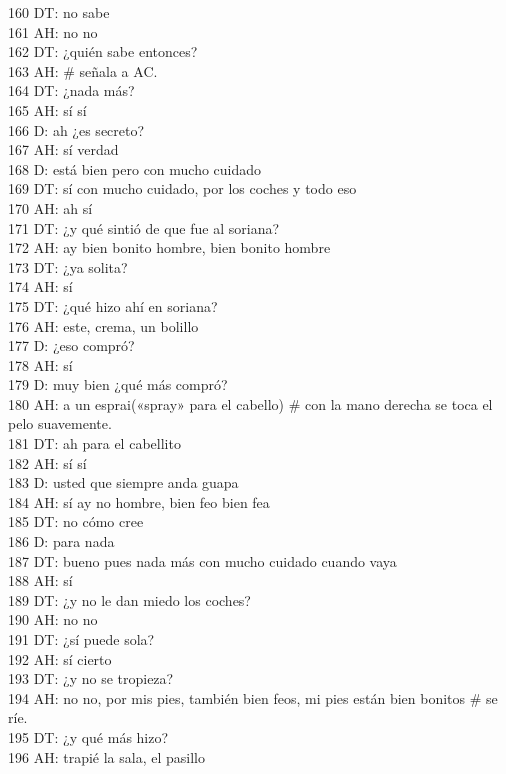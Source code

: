 160 DT: no sabe\\
161 AH: no no\\
162 DT: ¿quién sabe entonces?\\
163 AH: \# señala a AC.\\
164 DT: ¿nada más?\\
165 AH: sí sí\\
166 D: ah ¿es secreto?\\
167 AH: sí verdad\\
168 D: está bien pero con mucho cuidado\\
169 DT: sí con mucho cuidado, por los coches y todo eso\\
170 AH: ah sí\\
171 DT: ¿y qué sintió de que fue al soriana?\\
172 AH: ay bien bonito hombre, bien bonito hombre\\
173 DT: ¿ya solita?\\
174 AH: sí\\
175 DT: ¿qué hizo ahí en soriana?\\
176 AH: este, crema, un bolillo\\
177 D: ¿eso compró?\\
178 AH: sí\\
179 D: muy bien ¿qué más compró?\\
180 AH: a un esprai(«spray» para el cabello) \# con la mano derecha se toca el pelo suavemente.\\
181 DT: ah para el cabellito\\
182 AH: sí sí\\
183 D: usted que siempre anda guapa\\
184 AH: sí ay no hombre, bien feo bien fea\\
185 DT: no cómo cree\\
186 D: para nada\\
187 DT: bueno pues nada más con mucho cuidado cuando vaya\\
188 AH: sí\\
189 DT: ¿y no le dan miedo los coches?\\
190 AH: no no\\
191 DT: ¿sí puede sola?\\
192 AH: sí cierto\\
193 DT: ¿y no se tropieza?\\
194 AH: no no, por mis pies, también bien feos, mi pies están bien bonitos \# se ríe.\\
195 DT: ¿y qué más hizo?\\
196 AH: trapié la sala, el pasillo\\
